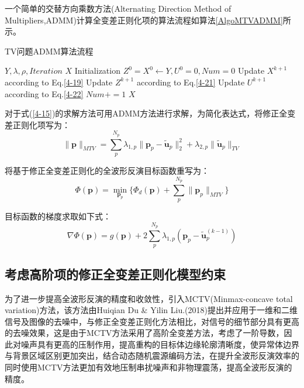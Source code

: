 \documentclass[12pt]{article}
\renewcommand{\algorithmicrequire}{\textbf{参数说明:}}
\renewcommand{\algorithmicensure}{\textbf{输出:}}
\newcommand{\upcite}[1]{\textsuperscript{\textsuperscript{\cite{#1}}}}
\begin{document}
\par
一个简单的交替方向乘数方法(Alternating Direction Method of Multipliers,ADMM)计算全变差正则化项的算法流程如算法\ref{AlgoMTVADMM}所示。
\begin{algorithm}[H]
\caption{TV问题ADMM算法流程}
\label{AlgoMTVADMM}
\renewcommand{\algorithmicrequire}{\textbf{输入:}}
\renewcommand{\algorithmicensure}{\textbf{输出:}}
\begin{algorithmic}[1]
\Require
$Y,\lambda,\rho,Iteration$
\Ensure
$X$
\State Initialization $Z^0=X^0 \gets Y,U^0=0,Num=0$
\State Update $X^{k+1}$ according to Eq.\ref{4-19}
\State Update $Z^{k+1}$ according to Eq.\ref{4-21}
\State Update $U^{k+1}$ according to Eq.\ref{4-22}
\State $Num+=1$
\EndWhile
\State \Return $X$
\end{algorithmic}
\end{algorithm}
\par
对于式(\ref{4-15})的求解方法可用ADMM方法进行求解，为简化表达式，将修正全变差正则化项写为：
\begin{equation}\label{4-23}
\parallel \boldsymbol{p} \parallel_{MTV}=\sum_p^{N_p}\lambda_{1,p}\parallel \boldsymbol{p}_p-\tilde{\boldsymbol{u}}_p \parallel_2^2+\lambda_{2,p}\parallel\tilde{\boldsymbol{u}}_p\parallel_{TV}
\end{equation}
\par
将基于修正全变差正则化的全波形反演目标函数重写为：
\begin{equation}\label{4-24}
\Phi(\boldsymbol{p})=\min_{\boldsymbol{p}_p}\{\Phi_d(\boldsymbol{p})+\sum_p^{N_p}\parallel\boldsymbol{p}_p\parallel_{MTV}\}
\end{equation}
\par
目标函数的梯度求取如下式：
\begin{equation}\label{4-25}
\nabla\Phi(\boldsymbol{p})=g(\boldsymbol{p})+2\sum_p^{N_p}\lambda_{1,p}(\boldsymbol{p}_p-\tilde{\boldsymbol{u}}_p^{(k-1)})
\end{equation}
\subsection{考虑高阶项的修正全变差正则化模型约束}
为了进一步提高全波形反演的精度和收敛性，引入MCTV(Minmax-concave total variation)方法，该方法由Huiqian Du \& Yilin Liu.(2018)提出并应用于一维和二维信号及图像的去噪中\upcite{DuHLiuY2018}，与修正全变差正则化方法相比，对信号的细节部分具有更高的去噪效果，这是由于MCTV方法采用了高阶全变差方法，考虑了一阶导数，因此对噪声具有更高的压制作用，提高重构的目标体边缘轮廓清晰度，使异常体边界与背景区域区别更加突出，结合动态随机震源编码方法，在提升全波形反演效率的同时使用MCTV方法更加有效地压制串扰噪声和非物理震荡，提高全波形反演的精度。
\end{document}
